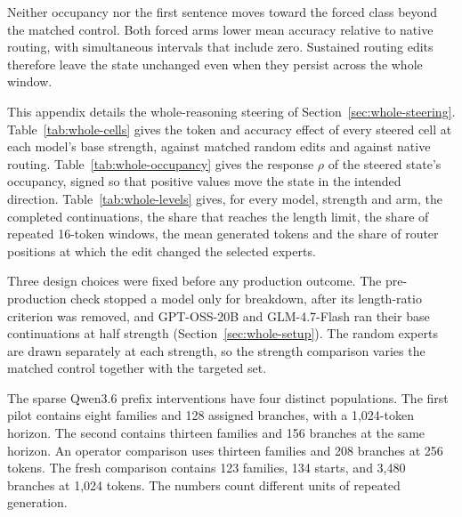 

Neither occupancy nor the first sentence moves toward the forced class beyond the matched control.
%
Both forced arms lower mean accuracy relative to native routing, with simultaneous intervals that include zero.
%
Sustained routing edits therefore leave the state unchanged even when they persist across the whole window.
%


This appendix details the whole-reasoning steering of Section~\ref{sec:whole-steering}.
%
Table~\ref{tab:whole-cells} gives the token and accuracy effect of every steered cell at each model's base strength, against matched random edits and against native routing.
%
Table~\ref{tab:whole-occupancy} gives the response $\rho$ of the steered state's occupancy, signed so that positive values move the state in the intended direction.
%
Table~\ref{tab:whole-levels} gives, for every model, strength and arm, the completed continuations, the share that reaches the length limit, the share of repeated 16-token windows, the mean generated tokens and the share of router positions at which the edit changed the selected experts.
%

Three design choices were fixed before any production outcome.
%
The pre-production check stopped a model only for breakdown, after its length-ratio criterion was removed, and GPT-OSS-20B and GLM-4.7-Flash ran their base continuations at half strength (Section~\ref{sec:whole-setup}).
%
The random experts are drawn separately at each strength, so the strength comparison varies the matched control together with the targeted set.
%








The sparse Qwen3.6 prefix interventions have four distinct populations.
%
The first pilot contains eight families and 128 assigned branches, with a 1,024-token horizon.
%
The second contains thirteen families and 156 branches at the same horizon.
%
An operator comparison uses thirteen families and 208 branches at 256 tokens.
%
The fresh comparison contains 123 families, 134 starts, and 3,480 branches at 1,024 tokens.
%
The numbers count different units of repeated generation.
%

